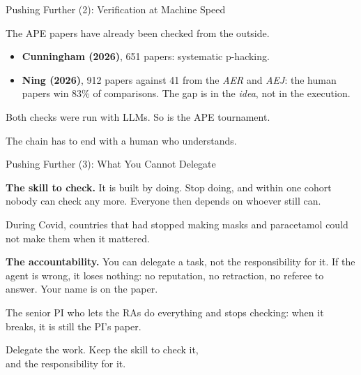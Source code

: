 \documentclass[svgnames,x11names,dvipsnames]{beamer}
\begin{document}
\begin{frame}{Pushing Further (2): Verification at Machine Speed}

The APE papers have already been checked from the outside.

\vspace{0.3cm}

\begin{itemize}
    \item \textbf{Cunningham (2026)}, 651 papers: systematic p-hacking.
    \vspace{0.15cm}
    \item \textbf{Ning (2026)}, 912 papers against 41 from the \emph{AER} and \emph{AEJ}: the human papers win 83\% of comparisons. The gap is in the \emph{idea}, not in the execution.
\end{itemize}

\vspace{0.4cm}

Both checks were run with LLMs. So is the APE tournament.

\vspace{0.4cm}


\vspace{0.4cm}

The chain has to end with a human who understands.

\end{frame}

\begin{frame}{Pushing Further (3): What You Cannot Delegate}

\textbf{The skill to check.}
It is built by doing. Stop doing, and within one cohort nobody can check any more. Everyone then depends on whoever still can.

\vspace{0.1cm}
{\small During Covid, countries that had stopped making masks and paracetamol could not make them when it mattered.}

\vspace{0.4cm}

\textbf{The accountability.}
You can delegate a task, not the responsibility for it. If the agent is wrong, it loses nothing: no reputation, no retraction, no referee to answer. Your name is on the paper.

\vspace{0.1cm}
{\small The senior PI who lets the RAs do everything and stops checking: when it breaks, it is still the PI's paper.}

\vspace{0.5cm}

\centering
\alert{Delegate the work. Keep the skill to check it,\\ and the responsibility for it.}

\end{frame}
\end{document}
